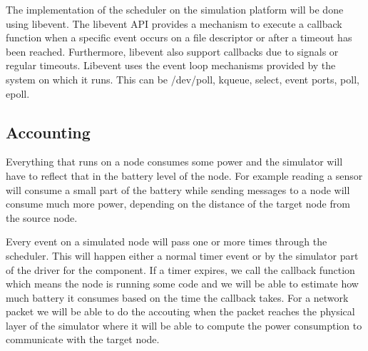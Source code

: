 The implementation of the scheduler on the simulation platform will be done
using libevent\cite{libevent}. The libevent API provides a mechanism to execute a callback
function when a specific event occurs on a file descriptor or after a timeout
has been reached. Furthermore, libevent also support callbacks due to signals
or regular timeouts. Libevent uses the event loop mechanisms provided by the
system on which it runs. This can be /dev/poll, kqueue, select, event ports,
poll, epoll.

\subsection{Accounting}

Everything that runs on a node consumes some power and the simulator will have
to reflect that in the battery level of the node. For example reading a sensor
will consume a small part of the battery while sending messages to a node will
consume much more power, depending on the distance of the target node from the
source node.

Every event on a simulated node will pass one or more times through the
scheduler. This will happen either a normal timer event or by the simulator
part of the driver for the component. If a timer expires, we call the callback
function which means the node is running some code and we will be able to
estimate how much battery it consumes based on the time the callback takes.
For a network packet we will be able to do the accouting when the packet
reaches the physical layer of the simulator where it will be able to compute
the power consumption to communicate with the target node.
